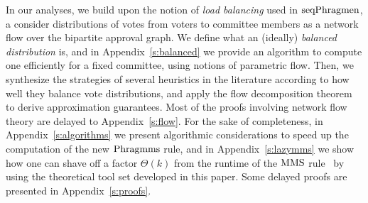 In our analyses, we build upon the notion of \emph{load balancing} used in $\operatorname{seqPhragmen}$, a consider distributions of votes from voters to committee members as a network flow over the bipartite approval graph.  
We define what an (ideally) \emph{balanced distribution} is, and in Appendix~\ref{s:balanced} we provide an algorithm to compute one efficiently for a fixed committee, using notions of parametric flow. 
Then, we synthesize the strategies of several heuristics in the literature according to how well they balance vote distributions,  and apply the flow decomposition theorem to derive approximation guarantees. Most of the proofs involving network flow theory are delayed to Appendix~\ref{s:flow}. 
%
For the sake of completeness, in Appendix~\ref{s:algorithms} we present algorithmic considerations to speed up the computation of the new $\operatorname{Phragmms}$ rule, and in Appendix~\ref{s:lazymms} we show how one can shave off a factor $\Theta(k)$ from the runtime of the $\operatorname{MMS}$ rule~\cite{sanchez2016maximin} by using the theoretical tool set developed in this paper. Some delayed proofs are presented in Appendix~\ref{s:proofs}.
